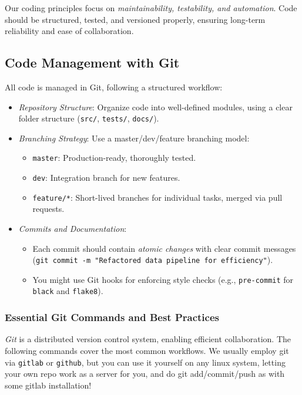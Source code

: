 Our coding principles focus on \emph{maintainability, testability, and automation}. Code should be structured, tested, and versioned properly, ensuring long-term reliability and ease of collaboration.

\subsection{Code Management with Git}
All code is managed in Git, following a structured workflow:
\begin{itemize}[itemsep=1pt,topsep=3pt]
    \item \emph{Repository Structure}: Organize code into well-defined modules, using a clear folder structure (\texttt{src/}, \texttt{tests/}, \texttt{docs/}).
    \item \emph{Branching Strategy}: Use a master/dev/feature branching model:
    \begin{itemize}[itemsep=1pt,topsep=3pt]
        \item \texttt{master}: Production-ready, thoroughly tested.
        \item \texttt{dev}: Integration branch for new features.
        \item \texttt{feature/*}: Short-lived branches for individual tasks, merged via pull requests.
    \end{itemize}
    \item \emph{Commits and Documentation}:
    \begin{itemize}[itemsep=1pt,topsep=3pt]
        \item Each commit should contain \emph{atomic changes} with clear commit messages (\texttt{git commit -m "Refactored data pipeline for efficiency"}).
        \item You might use Git hooks for enforcing style checks (e.g., \texttt{pre-commit} for \texttt{black} and \texttt{flake8}). 
    \end{itemize}
\end{itemize}

\subsubsection{Essential Git Commands and Best Practices}
\emph{Git} is a distributed version control system, enabling efficient collaboration. The following commands cover the most common workflows. We usually employ git via \texttt{gitlab} or \texttt{github}, but you can use it yourself on any linux system, letting your own repo work as a server for you, and do git add/commit/push as with some gitlab installation!

